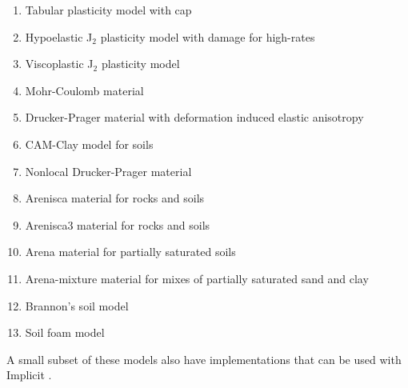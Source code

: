 \begin{enumerate}
  \item Tabular plasticity model with cap
  \item Hypoelastic J$_2$ plasticity model with damage for high-rates
  \item Viscoplastic J$_2$ plasticity model
  \item Mohr-Coulomb material
  \item Drucker-Prager material with deformation induced elastic anisotropy
  \item CAM-Clay model for soils
  \item Nonlocal Drucker-Prager material
  \item Arenisca material for rocks and soils
  \item Arenisca3 material for rocks and soils
  \item Arena material for partially saturated soils
  \item Arena-mixture material for mixes of partially saturated sand and clay
  \item Brannon's soil model
  \item Soil foam model
\end{enumerate}
A small subset of these models also have implementations that can be used with
Implicit \MPM.

